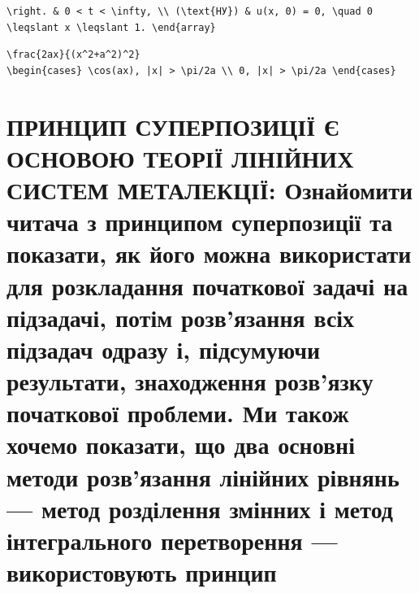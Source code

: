 \documentclass[
  ukrainian,
]{article}
\begin{document}
\begin{verbatim}
\right. & 0 < t < \infty, \\ (\text{НУ}) & u(x, 0) = 0, \quad 0 \leqslant x \leqslant 1. \end{array}
\end{verbatim}

\begin{verbatim}
\frac{2ax}{(x^2+a^2)^2}
\begin{cases} \cos(ax), |x| > \pi/2a \\ 0, |x| > \pi/2a \end{cases}
\end{verbatim}

\section{ПРИНЦИП СУПЕРПОЗИЦІЇ Є ОСНОВОЮ ТЕОРІЇ ЛІНІЙНИХ СИСТЕМ
МЕТАЛЕКЦІЇ: Ознайомити читача з принципом суперпозиції та показати, як
його можна використати для розкладання початкової задачі на підзадачі,
потім розв'язання всіх підзадач одразу і, підсумуючи результати,
знаходження розв'язку початкової проблеми. Ми також хочемо показати, що
два основні методи розв'язання лінійних рівнянь --- метод розділення
змінних і метод інтегрального перетворення --- використовують принцип
}
\end{document}
